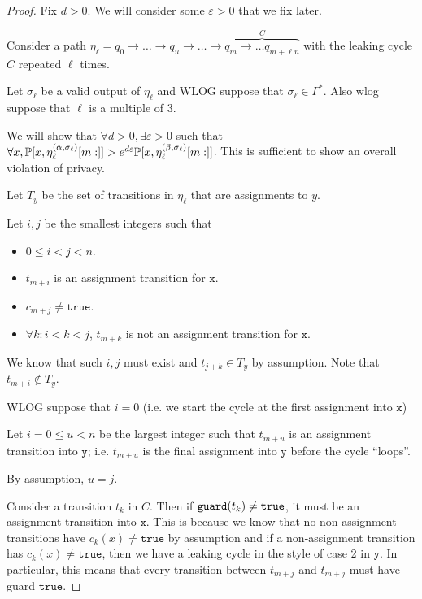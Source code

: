 \begin{proof}
	Fix $d>0$. We will consider some $\varepsilon>0$ that we fix later. 

	Consider a path $\eta_\ell = q_0\to\ldots\to q_u\to \ldots\to \overbrace{q_m\to \ldots q_{m+\ell n}}^{C}$ with the leaking cycle $C$ repeated $\ell$ times.

	Let $\sigma_\ell$ be a valid output of $\eta_\ell$ and WLOG suppose that $\sigma_\ell\in\Gamma^*$. Also wlog suppose that $\ell$ is a multiple of 3. 

	We will show that $\forall d>0, \exists \varepsilon>0$ such that $\forall x, \mathbb{P}[x, \eta_\ell^{(\alpha, \sigma_\ell)}[m:]]>e^{d\varepsilon} \mathbb{P}[x, \eta_\ell^{(\beta, \sigma_\ell)}[m:]]$. This is sufficient to show an overall violation of privacy. 

	Let $T_y$ be the set of transitions in $\eta_\ell$ that are assignments to $y$. 

	Let $i, j$ be the smallest integers such that \begin{itemize}
		\item $0\leq i <j<n$.
		\item $t_{m+i}$ is an assignment transition for $\texttt{x}$.
		\item $c_{m+j}\neq \texttt{true}$.
		\item $\forall k:i<k<j$, $t_{m+k}$ is not an assignment transition for $\texttt{x}$.
	\end{itemize}

	We know that such $i, j$ must exist and $t_{j+k}\in T_y$ by assumption. Note that $t_{m+i}\notin T_y$. 

	WLOG suppose that $i=0$ (i.e. we start the cycle at the first assignment into $\texttt{x}$)

	Let $i=0\leq u <n$ be the largest integer such that $t_{m+u}$ is an assignment transition into $\texttt{y}$; i.e. $t_{m+u}$ is the final assignment into $\texttt{y}$ before the cycle ``loops''. 

	By assumption, $u = j$.
	
	Consider a transition $t_k$ in $C$. Then if $\texttt{guard}(t_k)\neq \texttt{true}$, it must be an assignment transition into $\texttt{x}$. This is because we know that no non-assignment transitions have $c_k(x) \neq \texttt{true}$ by assumption and if a non-assignment transition has $c_k(x) \neq \texttt{true}$, then we have a leaking cycle in the style of case 2 in $\texttt{y}$. In particular, this means that every transition between $t_{m+j}$ and $t_{m+j}$ must have guard $\texttt{true}$. 


\end{proof}
